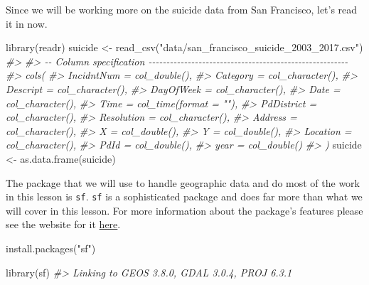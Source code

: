 \documentclass[
  12pt,
]{book}
\newenvironment{Shaded}{\begin{snugshade}}{\end{snugshade}}
\newcommand{\CommentTok}[1]{\textcolor[rgb]{0.37,0.37,0.37}{\textit{#1}}}
\newcommand{\FunctionTok}[1]{\textcolor[rgb]{0,0,0}{#1}}
\newcommand{\NormalTok}[1]{#1}
\newcommand{\OtherTok}[1]{\textcolor[rgb]{0.37,0.37,0.37}{#1}}
\newcommand{\StringTok}[1]{\textcolor[rgb]{0.5,0.5,0.5}{#1}}
\begin{document}
Since we will be working more on the suicide data from San Francisco, let's read it in now.

\begin{Shaded}
\begin{Highlighting}[]
\FunctionTok{library}\NormalTok{(readr)}
\NormalTok{suicide }\OtherTok{\textless{}{-}} \FunctionTok{read\_csv}\NormalTok{(}\StringTok{"data/san\_francisco\_suicide\_2003\_2017.csv"}\NormalTok{)}
\CommentTok{\#\textgreater{} }
\CommentTok{\#\textgreater{} {-}{-} Column specification {-}{-}{-}{-}{-}{-}{-}{-}{-}{-}{-}{-}{-}{-}{-}{-}{-}{-}{-}{-}{-}{-}{-}{-}{-}{-}{-}{-}{-}{-}{-}{-}{-}{-}{-}{-}{-}{-}{-}{-}{-}{-}{-}{-}{-}{-}{-}{-}{-}{-}{-}{-}{-}{-}{-}{-}}
\CommentTok{\#\textgreater{} cols(}
\CommentTok{\#\textgreater{}   IncidntNum = col\_double(),}
\CommentTok{\#\textgreater{}   Category = col\_character(),}
\CommentTok{\#\textgreater{}   Descript = col\_character(),}
\CommentTok{\#\textgreater{}   DayOfWeek = col\_character(),}
\CommentTok{\#\textgreater{}   Date = col\_character(),}
\CommentTok{\#\textgreater{}   Time = col\_time(format = ""),}
\CommentTok{\#\textgreater{}   PdDistrict = col\_character(),}
\CommentTok{\#\textgreater{}   Resolution = col\_character(),}
\CommentTok{\#\textgreater{}   Address = col\_character(),}
\CommentTok{\#\textgreater{}   X = col\_double(),}
\CommentTok{\#\textgreater{}   Y = col\_double(),}
\CommentTok{\#\textgreater{}   Location = col\_character(),}
\CommentTok{\#\textgreater{}   PdId = col\_double(),}
\CommentTok{\#\textgreater{}   year = col\_double()}
\CommentTok{\#\textgreater{} )}
\NormalTok{suicide }\OtherTok{\textless{}{-}} \FunctionTok{as.data.frame}\NormalTok{(suicide)}
\end{Highlighting}
\end{Shaded}

The package that we will use to handle geographic data and do most of the work in this lesson is \texttt{sf}. \texttt{sf} is a sophisticated package and does far more than what we will cover in this lesson. For more information about the package's features please see the website for it \href{http://r-spatial.github.io/sf/}{here}.

\begin{Shaded}
\begin{Highlighting}[]
\FunctionTok{install.packages}\NormalTok{(}\StringTok{"sf"}\NormalTok{)}
\end{Highlighting}
\end{Shaded}

\begin{Shaded}
\begin{Highlighting}[]
\FunctionTok{library}\NormalTok{(sf)}
\CommentTok{\#\textgreater{} Linking to GEOS 3.8.0, GDAL 3.0.4, PROJ 6.3.1}
\end{Highlighting}
\end{Shaded}
\end{document}
